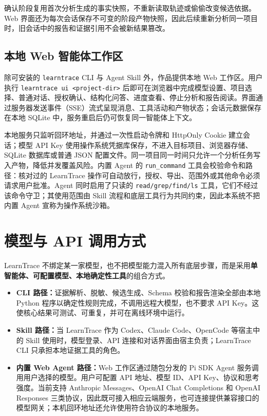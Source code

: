\documentclass[UTF8,a4paper,12pt]{ctexart}
\begin{document}
确认阶段复用首次分析生成的事实快照，不重新读取轨迹或偷偷改变候选依据。Web 界面还为每次会话保存不可变的阶段产物快照，因此后续重新分析同一项目时，旧会话中的报告和证据引用不会被新结果篡改。

\subsection{本地 Web 智能体工作区}

除可安装的 \texttt{learntrace} CLI 与 Agent Skill 外，作品提供本地 Web 工作区。用户执行 \texttt{learntrace ui <project-dir>} 后即可在浏览器中完成模型设置、项目选择、普通对话、授权确认、结构化问答、进度查看、停止分析和报告阅读。界面通过服务器发送事件（SSE）流式呈现消息、工具活动和产物状态；会话元数据保存在本地 SQLite 中，服务重启后仍可恢复同一智能体上下文。

本地服务只监听回环地址，并通过一次性启动令牌和 HttpOnly Cookie 建立会话；模型 API Key 使用操作系统凭据库保存，不进入目标项目、浏览器存储、SQLite 数据库或普通 JSON 配置文件。同一项目同一时间只允许一个分析任务写入产物，降低并发覆盖风险。内置 Agent 的 \texttt{run\_command} 工具会校验命令和路径：核对过的 LearnTrace 操作可自动放行，授权、导出、范围外或其他命令必须请求用户批准。Agent 同时启用了只读的 \texttt{read/grep/find/ls} 工具，它们不经过该命令守卫；其使用范围由 Skill 流程和底层工具行为共同约束，因此本系统不把内置 Agent 宣称为操作系统沙箱。

\section{模型与 API 调用方式}

LearnTrace 不绑定某一家模型，也不把模型能力混入所有底层步骤，而是采用\textbf{单智能体、可配置模型、本地确定性工具}的组合方式。

\begin{itemize}
  \item \textbf{CLI 路径：}证据解析、脱敏、候选生成、Schema 校验和报告渲染全部由本地 Python 程序以确定性规则完成，不调用远程大模型，也不要求 API Key。这使核心结果可测试、可重复，并可在离线环境中运行。
  \item \textbf{Skill 路径：}当 LearnTrace 作为 Codex、Claude Code、OpenCode 等宿主中的 Skill 使用时，模型登录、API 连接和对话界面由宿主负责；LearnTrace CLI 只承担本地证据工具的角色。
  \item \textbf{内置 Web Agent 路径：}Web 工作区通过随包分发的 Pi SDK Agent 服务调用用户选择的模型。用户可配置 API 地址、模型 ID、API Key、协议和思考强度。当前支持 Anthropic Messages、OpenAI Chat Completions 和 OpenAI Responses 三类协议，因此既可接入相应云端服务，也可连接提供兼容接口的模型网关；本机回环地址还允许使用符合协议的本地服务。
\end{itemize}
\end{document}
